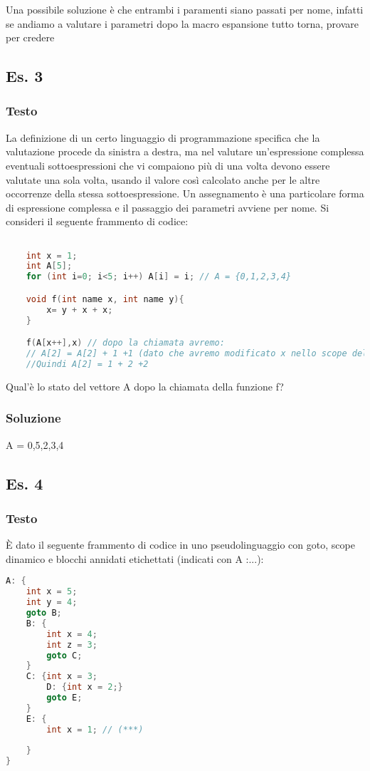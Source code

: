 Una possibile soluzione è che entrambi i paramenti siano passati per nome, infatti se andiamo a valutare i parametri dopo la macro espansione tutto torna, provare per credere

\subsection{Es. 3}
\subsubsection{Testo}
 La definizione di un certo linguaggio di programmazione specifica che la valutazione procede da sinistra a destra, ma nel valutare un'espressione complessa eventuali sottoespressioni che vi compaiono più di una volta devono essere valutate una sola volta, usando il valore così calcolato anche per le altre occorrenze della stessa sottoespressione. Un assegnamento è una particolare forma di espressione complessa e il passaggio dei parametri avviene per nome. Si consideri il seguente frammento di codice:
\begin{lstlisting}[language=C]

    int x = 1;
    int A[5];
    for (int i=0; i<5; i++) A[i] = i; // A = {0,1,2,3,4}

    void f(int name x, int name y){
        x= y + x + x;
    }

    f(A[x++],x) // dopo la chiamata avremo:
    // A[2] = A[2] + 1 +1 (dato che avremo modificato x nello scope del main)
    //Quindi A[2] = 1 + 2 +2
\end{lstlisting}
Qual'è lo stato del vettore A dopo la chiamata della funzione f?

\subsubsection{Soluzione}
A = {0,5,2,3,4}

\subsection{Es. 4}
\subsubsection{Testo}
È dato il seguente frammento di codice in uno pseudolinguaggio con goto, scope dinamico e blocchi annidati etichettati (indicati con A :{...}):
\begin{lstlisting}[language=C]
A: { 
    int x = 5;
    int y = 4;
    goto B;
    B: {
        int x = 4;
        int z = 3;
        goto C;
    }
    C: {int x = 3;
        D: {int x = 2;}
        goto E;
    }
    E: {
        int x = 1; // (***)
    
    }
}   
\end{lstlisting}

